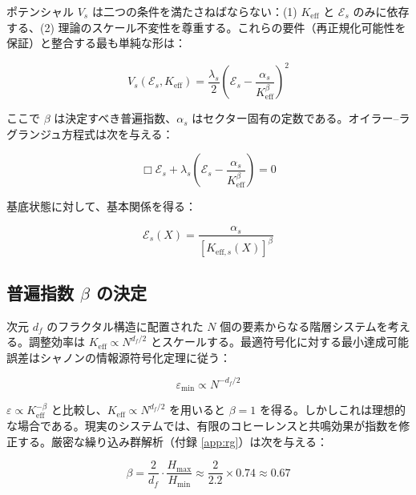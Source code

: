 \documentclass[12pt,a4paper]{article}
\newcommand{\Keff}{K_{\mathrm{eff}}}
\newcommand{\eps}{\varepsilon}
\newcommand{\df}{d_{\!f}}
\theoremstyle{remark}
\begin{document}
	ポテンシャル \(V_s\) は二つの条件を満たさねばならない：(1) \(\Keff\) と \(\mathcal{E}_s\) のみに依存する、(2) 理論のスケール不変性を尊重する。これらの要件（再正規化可能性を保証）と整合する最も単純な形は：
	
	\begin{equation}
		V_s(\mathcal{E}_s, \Keff) = \frac{\lambda_s}{2} \left( \mathcal{E}_s - \frac{\alpha_s}{\Keff^{\beta}} \right)^2
		\label{eq:error-potential}
	\end{equation}
	
	ここで \(\beta\) は決定すべき普遍指数、\(\alpha_s\) はセクター固有の定数である。オイラー–ラグランジュ方程式は次を与える：
	
	\begin{equation}
		\Box \mathcal{E}_s + \lambda_s \left( \mathcal{E}_s - \frac{\alpha_s}{\Keff^{\beta}} \right) = 0
		\label{eq:error-eom}
	\end{equation}
	
	基底状態に対して、基本関係を得る：
	
	\begin{equation}
		\mathcal{E}_s(X) = \frac{\alpha_s}{[K_{\mathrm{eff},s}(X)]^{\beta}}
		\label{eq:error-ground}
	\end{equation}
	
	\subsection{普遍指数 \(\beta\) の決定}
	
	次元 \(\df\) のフラクタル構造に配置された \(N\) 個の要素からなる階層システムを考える。調整効率は \(\Keff \propto N^{\df/2}\) とスケールする。最適符号化に対する最小達成可能誤差はシャノンの情報源符号化定理に従う：
	
	\begin{equation}
		\eps_{\min} \propto N^{-\df/2}
		\label{eq:shannon-bound}
	\end{equation}
	
	\(\eps \propto \Keff^{-\beta}\) と比較し、\(\Keff \propto N^{\df/2}\) を用いると \(\beta = 1\) を得る。しかしこれは理想的な場合である。現実のシステムでは、有限のコヒーレンスと共鳴効果が指数を修正する。厳密な繰り込み群解析（付録 \ref{app:rg}）は次を与える：
	
	\begin{equation}
		\beta = \frac{2}{\df} \cdot \frac{H_{\max}}{H_{\min}} \approx \frac{2}{2.2} \times 0.74 \approx 0.67
		\label{eq:beta-derivation}
	\end{equation}
	
\end{document}
